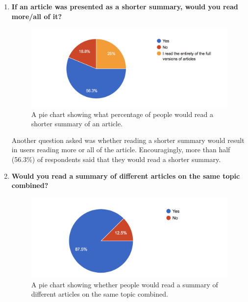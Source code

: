 \documentclass[12pt]{article}
\begin{document}
\begin{enumerate}
I further expanded upon the initial reading I had done about attention spans by asking potential users how much of articles they normally read. Only 18.8\% of respondents said that they read the entirety of articles (Figure \ref{SurveyArticleLength}), and as much as 15.6\% confess that they read less than 50\% of an article on average. It's plausible that the users could be missing key facts through not reading the entire article. On reflection, I could have also asked if this was a concern to those users. \\

\item \textbf{If an article was presented as a shorter summary, would you read more/all of it?}

\begin{figure}[ht!]
  \centering
    \includegraphics[scale=0.7]{06WouldYouReadAShorterSummary.png}
   \caption[Survey Graph regarding summarisations of articles]{A pie chart showing what percentage of people would read a shorter summary of an article.}
   \label{SurveyArticleLength}
\end{figure}

Another question asked was whether reading a shorter summary would result in users reading more or all of the article. Encouragingly, more than half (56.3\%) of respondents said that they would read a shorter summary. \\

\item \textbf{Would you read a summary of different articles on the same topic combined?}

\begin{figure}[ht!]
  \centering
    \includegraphics[scale=0.7]{07WouldYouReadASummaryOfArticlesCombined}
   \caption[Survey Graph about combining articles]{A pie chart showing whether people would read a summary of different articles on the same topic combined.}
   \label{SurveySummarisedArticles}
\end{figure}


\end{enumerate}
\end{document}
